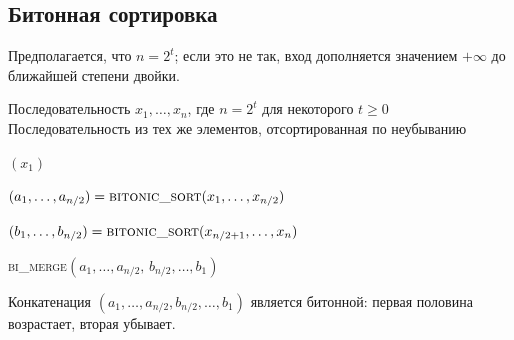 \subsection{Битонная сортировка}

Предполагается, что $n=2^t$; если это не так, вход дополняется значением $+\infty$ до ближайшей степени двойки.

\begin{algorithm}[H]
	\caption{\textsc{bitonic\_sort}$(x_1,\dots,x_n)$}
	\begin{algorithmic}[1]
		\Require Последовательность $x_1,\dots,x_n$, где $n = 2^t$ для некоторого $t \ge 0$
		\Ensure Последовательность из тех же элементов, отсортированная по неубыванию
		
		\State \Return $(x_1)$
		\EndIf
		
		\State $(a_1,\dots,a_{n/2}) = \textsc{bitonic\_sort}(x_1,\dots,x_{n/2})$
		
		\State $(b_1,\dots,b_{n/2}) = \textsc{bitonic\_sort}(x_{n/2+1},\dots,x_n)$
		
		\State \Return \textsc{bi\_merge}$(a_1,\dots,a_{n/2},\, b_{n/2},\dots,b_1)$
	\end{algorithmic}
\end{algorithm}

\noindent
Конкатенация $(a_1,\dots,a_{n/2},b_{n/2},\dots,b_1)$ является битонной: первая половина возрастает, вторая убывает.

